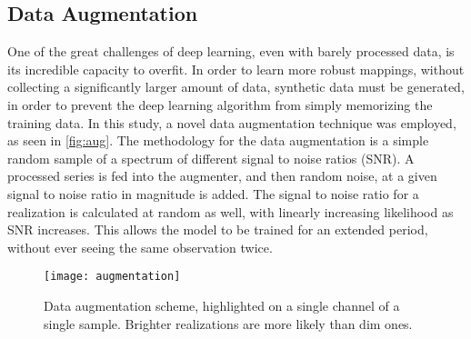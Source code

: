 \subsection{Data Augmentation}

One of the great challenges of deep learning, even with barely processed data, is its incredible capacity to overfit. In order to learn more robust mappings, without collecting a significantly larger amount of data, synthetic data must be generated, in order to prevent the deep learning algorithm from simply memorizing the training data. In this study, a novel data augmentation technique was employed, as seen in \autoref{fig:aug}. The methodology for the data augmentation is a simple random sample of a spectrum of different signal to noise ratios (SNR). A processed series is fed into the augmenter, and then random noise, at a given signal to noise ratio in magnitude is added. The signal to noise ratio for a realization is calculated at random as well, with linearly increasing likelihood as SNR increases. This allows the model to be trained for an extended period, without ever seeing the same observation twice.


\begin{figure}[H]
\caption{%
Data augmentation scheme, highlighted on a single channel of a single sample. Brighter realizations are more likely than dim ones.
}
\label{fig:aug}
\begin{center}
\texttt{[image: augmentation]}
\end{center}
\end{figure}
